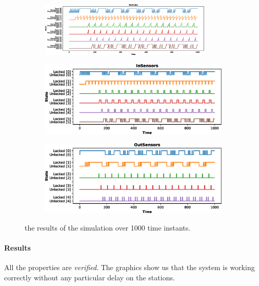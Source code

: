 \documentclass[a4paper]{article}
\begin{document}
    \begin{figure}[h!]
        \begin{subfigure}{\textwidth}
            \centering
            \includegraphics[width=0.9\textwidth]{images/scenarios/scenario2_stations}
        \end{subfigure}
        \begin{subfigure}{0.49\textwidth}
            \centering
            \includegraphics[width=\textwidth]{images/scenarios/scenario2_insensors}
        \end{subfigure}
        \hfill
        \begin{subfigure}{0.49\textwidth}
            \centering
            \includegraphics[width=\textwidth]{images/scenarios/scenario2_outsensors}
        \end{subfigure}
        \caption{the results of the simulation over 1000 time instants.}
    \end{figure}

    \paragraph{Results} All the properties are \textit{verified}. The graphics show us that the system is working correctly without any particular delay on the stations.
    
\end{document}
